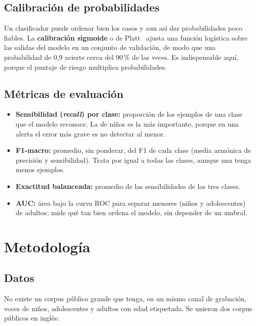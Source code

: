 \documentclass[11pt,a4paper]{article}
\begin{document}
\subsection{Calibración de probabilidades}

Un clasificador puede ordenar bien los casos y aun así dar probabilidades poco fiables. La \textbf{calibración sigmoide} o de Platt~\cite{platt1999} ajusta una función logística sobre las salidas del modelo en un conjunto de validación, de modo que una probabilidad de 0,9 acierte cerca del 90\,\% de las veces. Es indispensable aquí, porque el puntaje de riesgo multiplica probabilidades.

\subsection{Métricas de evaluación}

\begin{itemize}
  \item \textbf{Sensibilidad (\emph{recall}) por clase:} proporción de los ejemplos de una clase que el modelo reconoce. La de niños es la más importante, porque en una alerta el error más grave es no detectar al menor.
  \item \textbf{F1-macro:} promedio, sin ponderar, del F1 de cada clase (media armónica de precisión y sensibilidad). Trata por igual a todas las clases, aunque una tenga menos ejemplos.
  \item \textbf{Exactitud balanceada:} promedio de las sensibilidades de las tres clases.
  \item \textbf{AUC:} área bajo la curva ROC para separar menores (niños y adolescentes) de adultos; mide qué tan bien ordena el modelo, sin depender de un umbral.
\end{itemize}

\section{Metodología}

\subsection{Datos}

No existe un corpus público grande que tenga, en un mismo canal de grabación, voces de niños, adolescentes y adultos con edad etiquetada. Se unieron dos corpus públicos en inglés:
\end{document}
